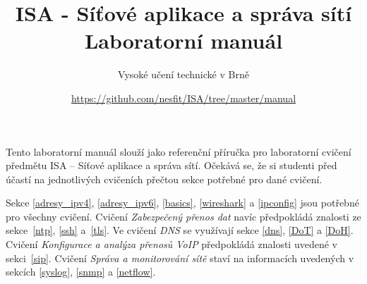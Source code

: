 \documentclass[a4paper,11pt]{article}
\title{ISA - Síťové aplikace a správa sítí\\
{\bf\large Laboratorní manuál}}
\author{Vysoké učení technické v Brně}
\date{\url{https://github.com/nesfit/ISA/tree/master/manual}}
\begin{document}
{\let\newpage\relax\maketitle}

Tento laboratorní manuál slouží jako referenční příručka pro laboratorní cvičení
předmětu ISA -- Síťové aplikace a správa sítí. Očekává se, že si studenti před
účastí na jednotlivých cvičeních přečtou sekce potřebné pro dané cvičení.

Sekce \ref{adresy_ipv4}, \ref{adresy_ipv6}, \ref{basics}, \ref{wireshark} a \ref{ipconfig} jsou
potřebné pro všechny cvičení. Cvičení \emph{Zabezpečený přenos dat} navíc
předpokládá znalosti ze sekce~\ref{ntp}, \ref{ssh} a~\ref{tls}. Ve cvičení \emph{DNS} se využívají sekce \ref{dns}, \ref{DoT} a \ref{DoH}. Cvičení
\emph{Konfigurace a analýza přenosů VoIP} předpokládá znalosti uvedené v
sekci~\ref{sip}. Cvičení \emph{Správa a monitorování sítě} staví na informacích
uvedených v sekcích \ref{syslog}, \ref{snmp} a \ref{netflow}.

\setcounter{tocdepth}{1}
\tableofcontents
\newpage












\newpage




\newpage
\thispagestyle{empty}
\end{document}
